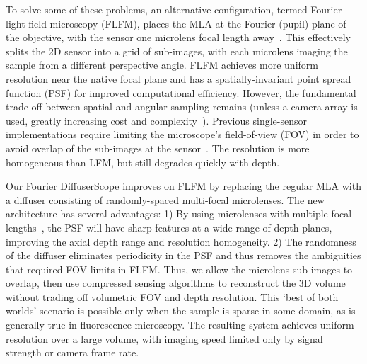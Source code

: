 \documentclass{osa-article}
\begin{document}
To solve some of these problems, an alternative configuration, termed Fourier light field microscopy (FLFM), places the MLA at the Fourier (pupil) plane of the objective, with the sensor one microlens focal length away~\cite{Martnez2016flfm,scrofani2018flfm,guo2019flfm,Martnez2020flfm}. This effectively splits the 2D sensor into a grid of sub-images, with each microlens imaging the sample from a different perspective angle. FLFM achieves more uniform resolution near the native focal plane and has a spatially-invariant point spread function (PSF) for improved computational efficiency. However, the fundamental trade-off between spatial and angular sampling remains (unless a camera array is used, greatly increasing cost and complexity~\cite{lin2015CameraArray}). Previous single-sensor implementations require limiting the microscope's field-of-view (FOV) in order to avoid overlap of the sub-images at the sensor~\cite{Martnez2016flfm,scrofani2018flfm,guo2019flfm,Martnez2020flfm}. The resolution is more homogeneous than LFM, but still degrades quickly with depth.

Our Fourier DiffuserScope improves on FLFM by replacing the regular MLA with a diffuser consisting of randomly-spaced multi-focal microlenses. The new architecture has several advantages: 1) By using microlenses with multiple focal lengths~\cite{Javidi2003multifocusLFM,perwass2012raytrix,georgiev2012multifocusLFM,cong2017rmla}, the PSF will have sharp features at a wide range of depth planes, improving the axial depth range and resolution homogeneity. 2) The randomness of the diffuser eliminates periodicity in the PSF and thus removes the ambiguities that required FOV limits in FLFM. Thus, we allow the microlens sub-images to overlap, then use compressed sensing algorithms \cite{donoho2006compressedsensing,candes2008compressedsensing} to reconstruct the 3D volume without trading off volumetric FOV and depth resolution. This `best of both worlds' scenario is possible only when the sample is sparse in some domain, as is generally true in fluorescence microscopy. The resulting system achieves uniform resolution over a large volume, with imaging speed limited only by signal strength or camera frame rate. 
\end{document}
